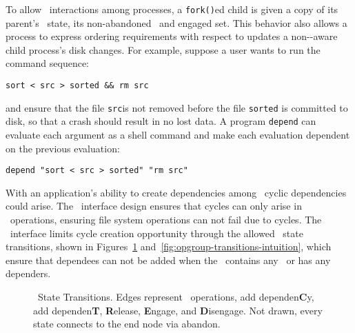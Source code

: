 To allow \opgroup\ interactions among processes, a \verb+fork()+ed
child is given a copy of its parent's \opgroup\ state, its
non-abandoned \opgroups\ and engaged set. This behavior also allows a
process to express ordering requirements with respect to updates a
non-\opgroup-aware child process's disk changes. For example, suppose
a user wants to run the command sequence:
%
\vspace{-0.5\baselineskip}
\begin{center}
\begin{small}
\verb+sort < src > sorted && rm src+
\end{small}
\end{center}
\vspace{-0.5\baselineskip}
%
and ensure that the file \verb+src+is not removed before the file
\verb+sorted+ is committed to disk, so that a crash should result in
no lost data. A program \texttt{depend} can evaluate each argument as
a shell command and make each evaluation dependent on the previous
evaluation:
%
\vspace{-0.5\baselineskip}
\begin{center}
\begin{small}
\verb+depend "sort < src > sorted" "rm src"+
\end{small}
\end{center}
\vspace{-0.5\baselineskip}

With an application's ability to create dependencies among \opgroups\,
cyclic dependencies could arise. The \opgroup\ interface design
ensures that cycles can only arise in \opgroup\ operations, ensuring
file system operations can not fail due to cycles. The \opgroup\
interface limits cycle creation opportunity through the allowed
\opgroup\ state transitions, shown in
Figures~\ref{fig:opgroup-transitions-states}
and~\ref{fig:opgroup-transitions-intuition}, which ensure that
dependees can not be added when the \opgroup\ contains any \chdescs\
or has any dependers.

\begin{figure}[htb]
\vspace{-0.5\baselineskip}
\centering{
\texttt{[image: opgroup\_transitions]}
}
\vspace{-0.5\baselineskip}
\caption{\label{fig:opgroup-transitions-states} \Opgroup\ State
  Transitions. Edges represent \opgroup\ operations, add
  dependen\textbf{C}y, add dependen\textbf{T}, \textbf{R}elease,
  \textbf{E}ngage, and \textbf{D}isengage. Not drawn, every state
  connects to the end node via abandon.}
\end{figure}

